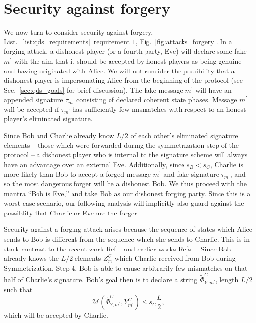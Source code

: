 \section{Security against forgery}\label{sec:qds_security_forgery}
We now turn to consider security against forgery, List.~\ref{list:qds_requirements}~requirement $1$, Fig.~\ref{fig:attacks_forgery}. In a forging attack, a dishonest player (or a fourth party, Eve) will declare some fake $m^\prime$ with the aim that it should be accepted by honest players as being genuine and having originated with Alice. %
We will not consider the possibility that a dishonest player is impersonating Alice from the beginning of the protocol (see Sec.~\ref{sec:qds_goals} for brief discussion). The fake message $m^\prime$ will have an appended signature $\tau_{m^\prime}$ consisting of declared coherent state phases. Message $m^\prime$ will be accepted if $\tau_{m^\prime}$ has sufficiently few mismatches with respect to an honest player's eliminated signature. 


Since Bob and Charlie already know $L/2$ of each other's eliminated signature elements -- those which were forwarded during the symmetrization step of the protocol -- a dishonest player who is internal to the signature scheme will always have an advantage over an external Eve. Additionally, since $s_B < s_C$, Charlie is more likely than Bob to accept a forged message $m^\prime$ and fake signature $\tau_{m^\prime}$, and so the most dangerous forger will be a dishonest Bob. We thus proceed with the mantra ``Bob is Eve,'' and take Bob as our dishonest forging party. Since this is a worst-case scenario, our following analysis will implicitly also guard against the possiblity that Charlie or Eve are the forger.

Security against a forging attack arises because the sequence of states which Alice sends to Bob is different from the sequence which she sends to Charlie. This is in stark contrast to the recent work Ref.~\cite{Croal2016} and earlier works Refs.~\cite{Collins2014, Donaldson2016, Dunjko2014, Gottesman2001}. Since Bob already knows the $L/2$ elements $Z_{m}^C$ which Charlie received from Bob during Symmetrization, Step $4$, Bob is able to cause arbitrarily few mismatches on that half of Charlie's signature. Bob's goal then is to declare a string $\tilde{\Phi}^C_{Y, m^\prime}$, length $L/2$ such that 
\begin{equation}\label{eqn:forging_condition}
\mathcal{M}\left(\tilde{\Phi}^C_{Y, m^\prime}, Y_{m^\prime}^C\right) \le s_C \frac{L}{2},
\end{equation}
which will be accepted by Charlie.

